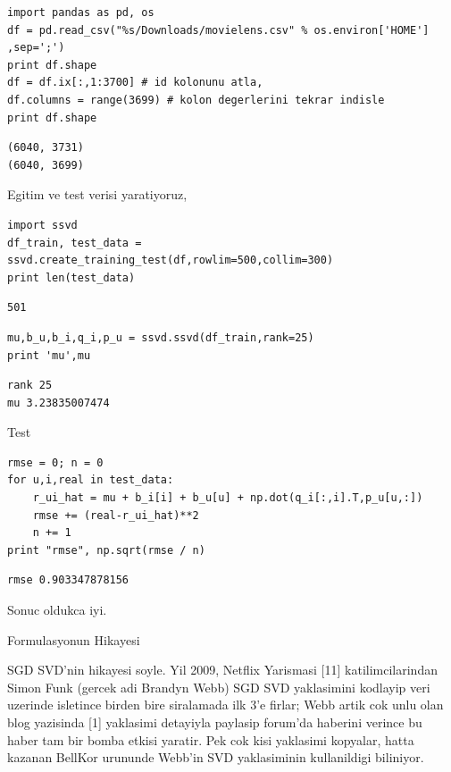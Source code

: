 \documentclass[12pt,fleqn]{article}\usepackage{../common}
\begin{document}
\begin{verbatim}
import pandas as pd, os
df = pd.read_csv("%s/Downloads/movielens.csv" % os.environ['HOME'] ,sep=';')
print df.shape
df = df.ix[:,1:3700] # id kolonunu atla,
df.columns = range(3699) # kolon degerlerini tekrar indisle
print df.shape
\end{verbatim}

\begin{verbatim}
(6040, 3731)
(6040, 3699)
\end{verbatim}

Egitim ve test verisi yaratiyoruz,

\begin{verbatim}
import ssvd
df_train, test_data = ssvd.create_training_test(df,rowlim=500,collim=300)
print len(test_data)
\end{verbatim}

\begin{verbatim}
501
\end{verbatim}

\begin{verbatim}
mu,b_u,b_i,q_i,p_u = ssvd.ssvd(df_train,rank=25)
print 'mu',mu
\end{verbatim}

\begin{verbatim}
rank 25
mu 3.23835007474
\end{verbatim}

Test

\begin{verbatim}
rmse = 0; n = 0
for u,i,real in test_data:
    r_ui_hat = mu + b_i[i] + b_u[u] + np.dot(q_i[:,i].T,p_u[u,:])
    rmse += (real-r_ui_hat)**2
    n += 1
print "rmse", np.sqrt(rmse / n)
\end{verbatim}

\begin{verbatim}
rmse 0.903347878156
\end{verbatim}

Sonuc oldukca iyi.

Formulasyonun Hikayesi

SGD SVD'nin hikayesi soyle. Yil 2009, Netflix Yarismasi [11]
katilimcilarindan Simon Funk (gercek adi Brandyn Webb) SGD SVD yaklasimini
kodlayip veri uzerinde isletince birden bire siralamada ilk 3'e firlar;
Webb artik cok unlu olan blog yazisinda [1] yaklasimi detayiyla paylasip
forum'da haberini verince bu haber tam bir bomba etkisi yaratir. Pek cok
kisi yaklasimi kopyalar, hatta kazanan BellKor urununde Webb'in SVD
yaklasiminin kullanildigi biliniyor.
\end{document}
